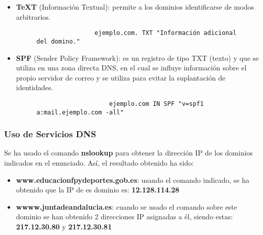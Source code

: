 \begin{itemize}
    \item \textbf{TeXT} (Información Textual): permite a los dominios identificarse de modos arbitrarios.

    \begin{figure}[H]
        \begin{tcolorbox}[sharp corners, colback=yellow!30, colframe=white!20]
            \scriptsize
            \begin{verbatim}
                ejemplo.com. TXT "Información adicional del domino."\end{verbatim}
        \end{tcolorbox}
    \end{figure}

    \item \textbf{SPF} (Sender Policy Framework): es un registro de tipo TXT (texto) y que se utiliza en una zona directa DNS, en el cual se influye información sobre el propio servidor de correo y se utiliza para evitar la suplantación de identidades.

        \begin{figure}[H]
        \begin{tcolorbox}[sharp corners, colback=yellow!30, colframe=white!20]
            \scriptsize
            \begin{verbatim}
                    ejemplo.com IN SPF "v=spf1 a:mail.ejemplo.com -all"\end{verbatim}
        \end{tcolorbox}
    \end{figure}
\end{itemize}

\subsubsection{Uso de Servicios DNS}
Se ha usado el comando \textbf{nslookup} para obtener la dirección IP de los dominios indicados en el enunciado. Así, el resultado obtenido ha sido:

\begin{itemize}
    \item \textbf{www.educacionfpydeportes.gob.es}: usando el comando indicado, se ha obtenido que la IP de es dominio es: \textbf{12.128.114.28}
    \item \textbf{wwww.juntadeandalucia.es}: cuando se usado el comando sobre este dominio se han obtenido 2 direcciones IP asignadas a él, siendo estas: \textbf{217.12.30.80} y \textbf{217.12.30.81}
\end{itemize}


